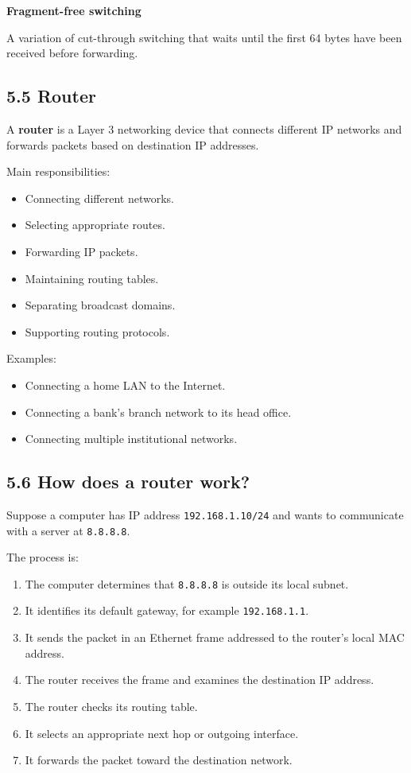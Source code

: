 \textbf{Fragment-free switching}

A variation of cut-through switching that waits until the first 64 bytes have been received before forwarding.

\subsection{5.5 Router}

A \textbf{router} is a Layer 3 networking device that connects different IP networks and forwards packets based on destination IP addresses.

Main responsibilities:

\begin{itemize}
    \item Connecting different networks.
    \item Selecting appropriate routes.
    \item Forwarding IP packets.
    \item Maintaining routing tables.
    \item Separating broadcast domains.
    \item Supporting routing protocols.
\end{itemize}

Examples:

\begin{itemize}
    \item Connecting a home LAN to the Internet.
    \item Connecting a bank's branch network to its head office.
    \item Connecting multiple institutional networks.
\end{itemize}

\subsection{5.6 How does a router work?}

Suppose a computer has IP address \texttt{192.168.1.10/24} and wants to communicate with a server at \texttt{8.8.8.8}.

The process is:

\begin{enumerate}
    \item The computer determines that \texttt{8.8.8.8} is outside its local subnet.
    \item It identifies its default gateway, for example \texttt{192.168.1.1}.
    \item It sends the packet in an Ethernet frame addressed to the router's local MAC address.
    \item The router receives the frame and examines the destination IP address.
    \item The router checks its routing table.
    \item It selects an appropriate next hop or outgoing interface.
    \item It forwards the packet toward the destination network.
\end{enumerate}

